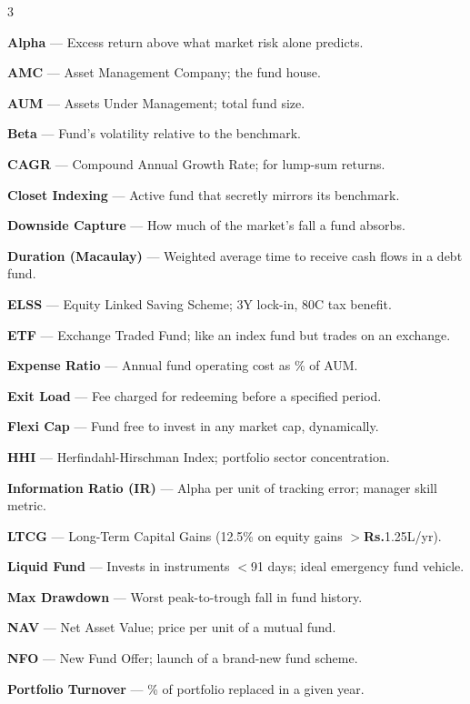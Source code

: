\documentclass[11pt,a4paper]{article}
\newcommand{\rupee}{\textbf{\textsf{Rs.}}}
\begin{document}
\vspace{5pt}
\begin{multicols}{3}
\footnotesize

\textbf{Alpha} --- Excess return above what market risk alone predicts.

\textbf{AMC} --- Asset Management Company; the fund house.

\textbf{AUM} --- Assets Under Management; total fund size.

\textbf{Beta} --- Fund's volatility relative to the benchmark.

\textbf{CAGR} --- Compound Annual Growth Rate; for lump-sum returns.

\textbf{Closet Indexing} --- Active fund that secretly mirrors its benchmark.

\textbf{Downside Capture} --- How much of the market's fall a fund absorbs.

\textbf{Duration (Macaulay)} --- Weighted average time to receive cash flows in a debt fund.

\textbf{ELSS} --- Equity Linked Saving Scheme; 3Y lock-in, 80C tax benefit.

\textbf{ETF} --- Exchange Traded Fund; like an index fund but trades on an exchange.

\textbf{Expense Ratio} --- Annual fund operating cost as \% of AUM.

\textbf{Exit Load} --- Fee charged for redeeming before a specified period.

\textbf{Flexi Cap} --- Fund free to invest in any market cap, dynamically.

\textbf{HHI} --- Herfindahl-Hirschman Index; portfolio sector concentration.

\textbf{Information Ratio (IR)} --- Alpha per unit of tracking error; manager skill metric.

\textbf{LTCG} --- Long-Term Capital Gains (12.5\% on equity gains $>$\rupee{}1.25L/yr).

\textbf{Liquid Fund} --- Invests in instruments $<$91 days; ideal emergency fund vehicle.

\textbf{Max Drawdown} --- Worst peak-to-trough fall in fund history.

\textbf{NAV} --- Net Asset Value; price per unit of a mutual fund.

\textbf{NFO} --- New Fund Offer; launch of a brand-new fund scheme.

\textbf{Portfolio Turnover} --- \% of portfolio replaced in a given year.


\end{multicols}
\end{document}
